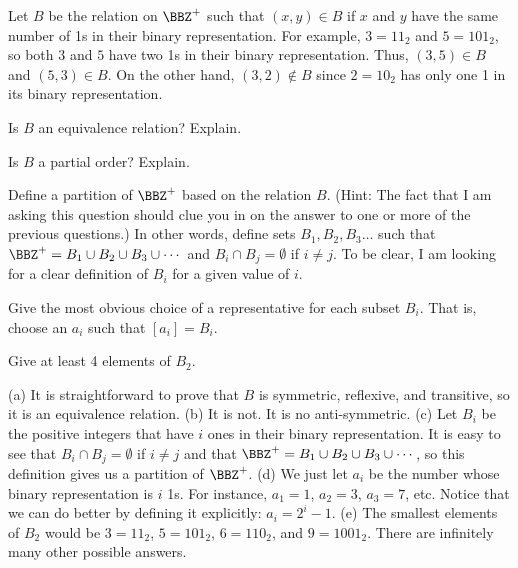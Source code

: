 \begin{requ}
Let $B$ be the relation on $\BBZ^+$ such that $(x,y)\in B$ if $x$ and $y$ have the same number of
1s in their binary representation. For example, $3=11_2$ and $5=101_2$, 
so both $3$ and $5$ have two 1s in their binary representation. 
Thus,  $(3,5)\in B$ and $(5,3)\in B$. 
On the other hand, $(3,2)\not\in B$ since
$2=10_2$ has only one 1 in its binary representation.
\begin{lenum}
\item Is $B$ an equivalence relation? Explain.
\item Is $B$ a partial order? Explain.
\item Define a partition of $\BBZ^+$ based on the relation $B$.
(Hint: The fact that I am asking this question should clue you in on the answer to one or more 
of the previous questions.) 
In other words, define sets 
$B_1, B_2, B_3\ldots$ such that $\BBZ^+ = B_1\cup B_2\cup B_3\cup\cdots$
and $B_i\cap B_j=\emptyset$ if $i\not = j$.
To be clear, I am looking for a clear definition of $B_i$ for a given value of $i$.
\item
Give the most obvious choice of a representative for each subset $B_i$.
That is, choose an $a_i$ such that $[a_i]=B_i$.
\item 
Give at least 4 elements of $B_2$.
\end{lenum}
\begin{requanswer}
(a) It is straightforward to prove that $B$ is symmetric, reflexive, and transitive, so it is an equivalence relation.
(b) It is not. It is no anti-symmetric.
(c) Let $B_i$ be the positive integers that have $i$ ones in their binary representation.
It is easy to see that $B_i\cap B_j=\emptyset$ if $i\not = j$ and that  $\BBZ^+ = B_1\cup B_2\cup B_3\cup\cdots$,
so this definition gives us a partition of $\BBZ^+$.
(d) We just let $a_i$ be the number whose binary representation is $i$ 1s.
For instance, $a_1=1$, $a_2=3$, $a_3=7$, etc. Notice that we can do better by defining it explicitly: $a_i=2^i-1$.
(e) The smallest elements of $B_2$ would be $3=11_2$, $5=101_2$, $6=110_2$, and $9=1001_2$. 
There are infinitely many other possible answers.
\end{requanswer}
\end{requ}
